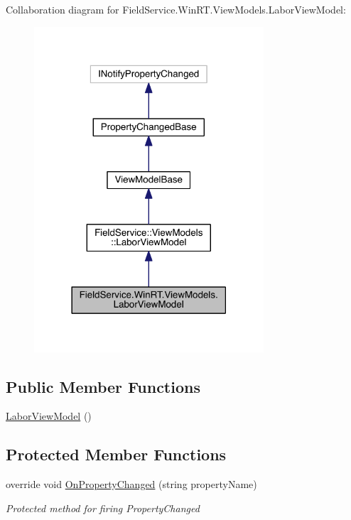 Collaboration diagram for Field\+Service.\+Win\+R\+T.\+View\+Models.\+Labor\+View\+Model\+:
\nopagebreak
\begin{figure}[H]
\begin{center}
\leavevmode
\includegraphics[width=242pt]{class_field_service_1_1_win_r_t_1_1_view_models_1_1_labor_view_model__coll__graph}
\end{center}
\end{figure}
\subsection*{Public Member Functions}
\begin{DoxyCompactItemize}
\item 
\hyperlink{class_field_service_1_1_win_r_t_1_1_view_models_1_1_labor_view_model_a47a6f9600f753467dd0f4a674524465b}{Labor\+View\+Model} ()
\end{DoxyCompactItemize}
\subsection*{Protected Member Functions}
\begin{DoxyCompactItemize}
\item 
override void \hyperlink{class_field_service_1_1_win_r_t_1_1_view_models_1_1_labor_view_model_a4750a450d53285bb3987a2207eab9360}{On\+Property\+Changed} (string property\+Name)
\begin{DoxyCompactList}\small\item\em Protected method for firing Property\+Changed \end{DoxyCompactList}\end{DoxyCompactItemize}
